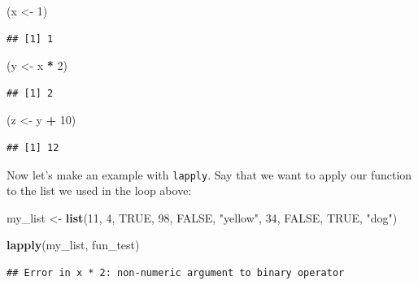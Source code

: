 \documentclass[
]{book}
\newenvironment{Shaded}{\begin{snugshade}}{\end{snugshade}}
\newcommand{\ConstantTok}[1]{\textcolor[rgb]{0.56,0.35,0.01}{#1}}
\newcommand{\DecValTok}[1]{\textcolor[rgb]{0.00,0.00,0.81}{#1}}
\newcommand{\FunctionTok}[1]{\textcolor[rgb]{0.13,0.29,0.53}{\textbf{#1}}}
\newcommand{\NormalTok}[1]{#1}
\newcommand{\OtherTok}[1]{\textcolor[rgb]{0.56,0.35,0.01}{#1}}
\newcommand{\SpecialCharTok}[1]{\textcolor[rgb]{0.81,0.36,0.00}{\textbf{#1}}}
\newcommand{\StringTok}[1]{\textcolor[rgb]{0.31,0.60,0.02}{#1}}
\begin{document}
\begin{Shaded}
\begin{Highlighting}[]
\NormalTok{(x }\OtherTok{\textless{}{-}} \DecValTok{1}\NormalTok{)}
\end{Highlighting}
\end{Shaded}

\begin{verbatim}
## [1] 1
\end{verbatim}

\begin{Shaded}
\begin{Highlighting}[]
\NormalTok{(y }\OtherTok{\textless{}{-}}\NormalTok{ x }\SpecialCharTok{*} \DecValTok{2}\NormalTok{)}
\end{Highlighting}
\end{Shaded}

\begin{verbatim}
## [1] 2
\end{verbatim}

\begin{Shaded}
\begin{Highlighting}[]
\NormalTok{(z }\OtherTok{\textless{}{-}}\NormalTok{ y }\SpecialCharTok{+} \DecValTok{10}\NormalTok{)}
\end{Highlighting}
\end{Shaded}

\begin{verbatim}
## [1] 12
\end{verbatim}

Now let's make an example with \texttt{lapply}. Say that we want to apply our function
to the list we used in the loop above:

\begin{Shaded}
\begin{Highlighting}[]
\NormalTok{my\_list }\OtherTok{\textless{}{-}} \FunctionTok{list}\NormalTok{(}\DecValTok{11}\NormalTok{, }\DecValTok{4}\NormalTok{, }\ConstantTok{TRUE}\NormalTok{, }\DecValTok{98}\NormalTok{, }\ConstantTok{FALSE}\NormalTok{, }\StringTok{"yellow"}\NormalTok{, }\DecValTok{34}\NormalTok{, }\ConstantTok{FALSE}\NormalTok{, }\ConstantTok{TRUE}\NormalTok{, }\StringTok{"dog"}\NormalTok{)}

\FunctionTok{lapply}\NormalTok{(my\_list, fun\_test)}
\end{Highlighting}
\end{Shaded}

\begin{verbatim}
## Error in x * 2: non-numeric argument to binary operator
\end{verbatim}
\end{document}
